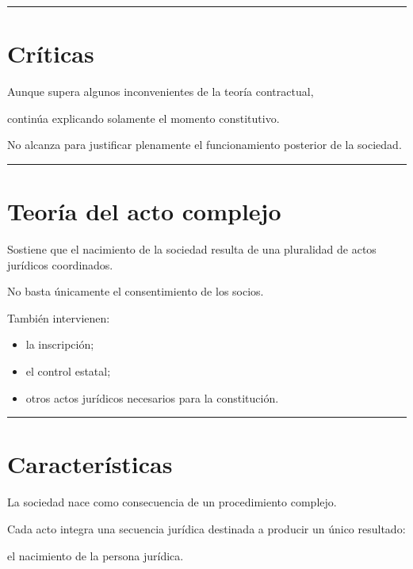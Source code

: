 \documentclass[
  spanish,
  letterpaper,
  DIV=11,
  numbers=noendperiod]{scrartcl}
\providecommand{\tightlist}{%
  \setlength{\itemsep}{0pt}\setlength{\parskip}{0pt}}
\begin{document}
\begin{center}\rule{0.5\linewidth}{0.5pt}\end{center}

\section{Críticas}\label{cruxedticas-1}

Aunque supera algunos inconvenientes de la teoría contractual,

continúa explicando solamente el momento constitutivo.

No alcanza para justificar plenamente el funcionamiento posterior de la
sociedad.

\begin{center}\rule{0.5\linewidth}{0.5pt}\end{center}

\section{Teoría del acto complejo}\label{teoruxeda-del-acto-complejo}

Sostiene que el nacimiento de la sociedad resulta de una pluralidad de
actos jurídicos coordinados.

No basta únicamente el consentimiento de los socios.

También intervienen:

\begin{itemize}
\tightlist
\item
  la inscripción;
\item
  el control estatal;
\item
  otros actos jurídicos necesarios para la constitución.
\end{itemize}

\begin{center}\rule{0.5\linewidth}{0.5pt}\end{center}

\section{Características}\label{caracteruxedsticas-1}

La sociedad nace como consecuencia de un procedimiento complejo.

Cada acto integra una secuencia jurídica destinada a producir un único
resultado:

el nacimiento de la persona jurídica.
\end{document}
